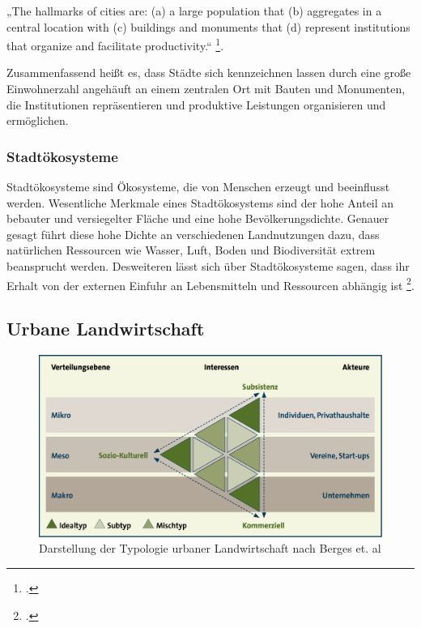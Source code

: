 \documentclass{scrartcl}
\begin{document}
\begin{displayquote} 
„The hallmarks of cities are: (a) a large population that (b) aggregates in a central location with (c) buildings and monuments that (d) represent institutions that organize and facilitate productivity.“ \footcite[S.16]{Elmqvist2013}. 
\end{displayquote}  Zusammenfassend heißt es, dass Städte sich kennzeichnen lassen durch eine große Einwohnerzahl angehäuft an einem zentralen Ort mit Bauten und Monumenten, die Institutionen repräsentieren und produktive Leistungen organisieren und ermöglichen.

\subsubsection{Stadtökosysteme}
Stadtökosysteme sind Ökosysteme, die von Menschen erzeugt und beeinflusst werden. Wesentliche Merkmale eines Stadtökosystems sind der hohe Anteil an bebauter und versiegelter Fläche und eine hohe Bevölkerungsdichte. Genauer gesagt führt diese hohe Dichte an verschiedenen Landnutzungen dazu, dass natürlichen Ressourcen wie Wasser, Luft, Boden und Biodiversität extrem beansprucht werden. Desweiteren lässt sich über Stadtökosysteme sagen, dass ihr Erhalt von der externen Einfuhr an Lebensmitteln und Ressourcen abhängig ist  \footcite[S.61]{Breuste2016Stadtokosysteme}.


\subsection{Urbane Landwirtschaft}

\begin{figure}[h]
\centering
\includegraphics[width=12cm]{image_folder/ul_typologie.png}
\caption{Darstellung der Typologie urbaner Landwirtschaft nach Berges et. al\footnotemark}
\label{fig:ul_typologie}
\end{figure}
\end{document}
